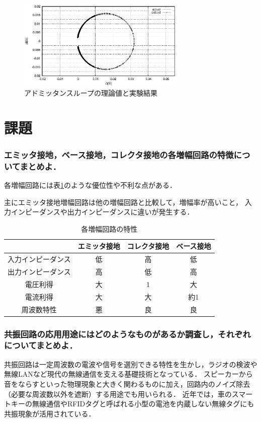 \documentclass[dvipdfmx,titlepage,a4j]{jsarticle}  %
\numberwithin{equation}{section}
\begin{document}
\begin{figure}[H]
  \centering
  \includegraphics[width=8cm]{../gnuplot/A_GB_2.eps}
  \caption{アドミッタンスループの理論値と実験結果}
  \label{fig:A_GB_2.eps}
\end{figure}


\section{課題}

\subsubsection{エミッタ接地，ベース接地，コレクタ接地の各増幅回路の特徴についてまとめよ．}
各増幅回路には表\ref{tab:feature}のような優位性や不利な点がある．

主にエミッタ接地増幅回路は他の増幅回路と比較して，増幅率が高いこと，
入力インピーダンスや出力インピーダンスに違いが発生する．

\begin{table}[h]
  \caption{各増幅回路の特性}
  \label{tab:feature}
  \centering
  \begin{tabular}{c|ccc} \hline
                       & エミッタ接地 & コレクタ接地 & ベース接地 \\ \hline\hline
    入力インピーダンス & 低           & 高           & 低         \\\hline
    出力インピーダンス & 高           & 低           & 高         \\\hline
    電圧利得           & 大           & 1            & 大         \\\hline
    電流利得           & 大           & 大           & 約1        \\\hline
    周波数特性         & 悪           & 良           & 良         \\ \hline
  \end{tabular}
\end{table}


\subsubsection{共振回路の応用用途にはどのようなものがあるか調査し，それぞれについてまとめよ．}
共振回路は一定周波数の電波や信号を選別できる特性を生かし，ラジオの検波や無線LANなど現代の無線通信を支える基礎技術となっている．
スピーカーから音をならすといった物理現象と大きく関わるものに加え，回路内のノイズ除去（必要な周波数以外を遮断）する用途でも用いられる．
近年では，車のスマートキーの無線通信やRFIDタグと呼ばれる小型の電池を内蔵しない無線タグにも共振現象が活用されている．
\end{document}
